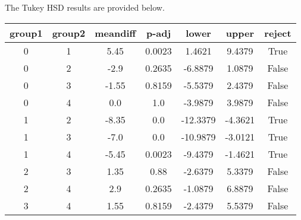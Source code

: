 The Tukey HSD results are provided below.
\begin{center}
\begin{tabular}{ccccccc}
\toprule
\textbf{group1} & \textbf{group2} & \textbf{meandiff} & \textbf{p-adj} & \textbf{lower} & \textbf{upper} & \textbf{reject}  \\
\midrule
       0        &        1        &        5.45       &     0.0023     &     1.4621     &     9.4379     &       True       \\
       0        &        2        &        -2.9       &     0.2635     &    -6.8879     &     1.0879     &      False       \\
       0        &        3        &       -1.55       &     0.8159     &    -5.5379     &     2.4379     &      False       \\
       0        &        4        &        0.0        &      1.0       &    -3.9879     &     3.9879     &      False       \\
       1        &        2        &       -8.35       &      0.0       &    -12.3379    &    -4.3621     &       True       \\
       1        &        3        &        -7.0       &      0.0       &    -10.9879    &    -3.0121     &       True       \\
       1        &        4        &       -5.45       &     0.0023     &    -9.4379     &    -1.4621     &       True       \\
       2        &        3        &        1.35       &      0.88      &    -2.6379     &     5.3379     &      False       \\
       2        &        4        &        2.9        &     0.2635     &    -1.0879     &     6.8879     &      False       \\
       3        &        4        &        1.55       &     0.8159     &    -2.4379     &     5.5379     &      False       \\
\bottomrule
\end{tabular}
\end{center}